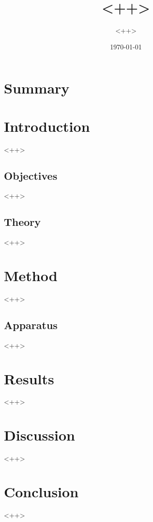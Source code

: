 \documentclass{article}
\begin{document}
\title{\textbf{<++>}}
\author{<++>}
\date{\today}
\maketitle
{}
\section{Summary}
\tableofcontents
\section{Introduction}
<++>
\subsection{Objectives}
<++>
\subsection{Theory}
<++>
\section{Method}
<++>
\subsection{Apparatus}
<++>
\section{Results}
<++>
\section{Discussion}
<++>
\section{Conclusion}
<++>
\clearpage
{}
\printbibliography
\end{document}
